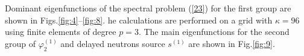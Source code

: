 \documentclass[authoryear]{elsarticle}
\begin{document}
Dominant eigenfunctions of the spectral problem (\ref{23}) for the first group are shown in Figs.\ref{fig:4}--\ref{fig:8}. 
he calculations are performed on a grid with $\kappa=96$ using finite elements of degree $p=3$.
The main eigenfunctions for the second group of  $\varphi^{(1)}_2$ and delayed neutrons source $s^{(1)}$  are shown in Fig.\ref{fig:9}. 

\begin{figure}[!h]
  \begin{center}
\begin{minipage}{0.49\linewidth}
 \\
\end{minipage}
\hfill
\begin{minipage}{0.49\linewidth}
 \\

\end{minipage}
\end{center}
\end{figure}
\end{document}
